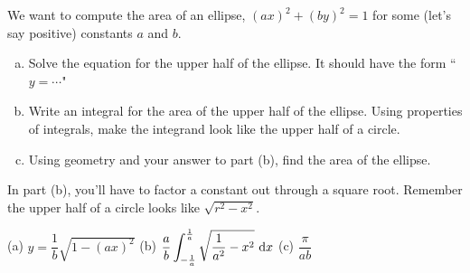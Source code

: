 \begin{question}\label{prob_s1.2:ellipsearea}
We want to compute the area of an ellipse, $(ax)^2+(by)^2=1$ for some (let's say positive) constants $a$ and $b$.
\begin{enumerate}[(a)]
\item Solve the equation for the upper half of the ellipse. It should have the form ``$y=\cdots$"
\item Write an integral for the area of the upper half of the ellipse. Using properties of integrals, make the integrand look like the upper half of a circle.
\item Using geometry and your answer to part (b), find the area of the ellipse.
\end{enumerate}
\end{question}
\begin{hint}
In part (b), you'll have to factor a constant out through a square root. Remember the upper half of a circle looks like $\sqrt{r^2-x^2}$.
\end{hint}
\begin{answer}
(a) $y = \dfrac{1}{b}\sqrt{1-(ax)^2}$\qquad
(b) $\displaystyle\frac{a}{b}\int_{-\frac{1}{a}}^{\frac{1}{a}}\sqrt{\frac{1}{a^2}-x^2}\ \dee{x}$
\qquad (c) $\dfrac{\pi}{ab}$
\end{answer}
